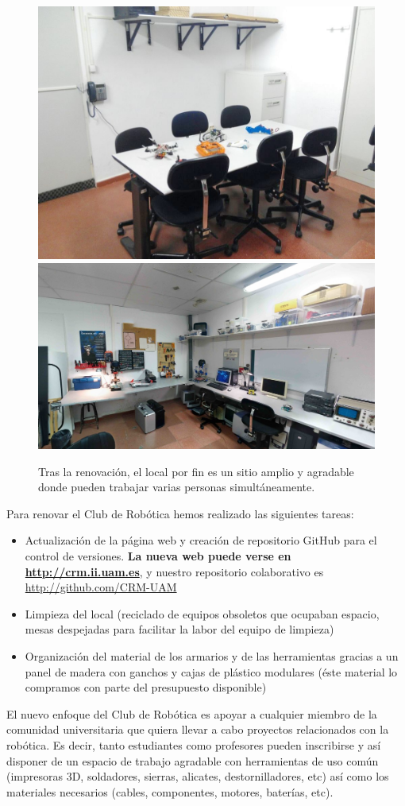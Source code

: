 \documentclass[12pt,twoside]{report}
\begin{document}
\begin{figure}[hbtp]
\centerline{\includegraphics[width=0.45\linewidth]{fotos/tallerDespues5}
\includegraphics[width=0.75\linewidth]{fotos/tallerDespues3}}
\caption*{
Tras la renovación, el local por fin es un sitio amplio y agradable donde pueden trabajar varias personas simultáneamente.
}
\end{figure}


Para renovar el Club de Robótica hemos realizado las siguientes tareas:

\begin{itemize}
\item Actualización de la página web y creación de repositorio GitHub para el control de versiones. \textbf{La nueva web puede verse en \url{http://crm.ii.uam.es}}, y nuestro repositorio colaborativo es \url{http://github.com/CRM-UAM}
\item Limpieza del local (reciclado de equipos obsoletos que ocupaban espacio, mesas despejadas para facilitar la labor del equipo de limpieza)
\item Organización del material de los armarios y de las herramientas gracias a un panel de madera con ganchos y cajas de plástico modulares (éste material lo compramos con parte del presupuesto disponible)
\end{itemize}

El nuevo enfoque del Club de Robótica es apoyar a cualquier miembro de la comunidad universitaria que quiera llevar a cabo proyectos relacionados con la robótica. Es decir, tanto estudiantes como profesores pueden inscribirse y así disponer de un espacio de trabajo agradable con herramientas de uso común (impresoras 3D, soldadores, sierras, alicates, destornilladores, etc) así como los materiales necesarios (cables, componentes, motores, baterías, etc).
\end{document}
